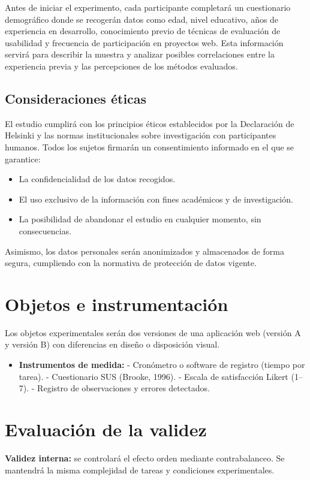 \documentclass[a4paper,12pt]{report}
\begin{document}
Antes de iniciar el experimento, cada participante completará un cuestionario demográfico donde se recogerán datos como edad, nivel educativo, años de experiencia en desarrollo, conocimiento previo de técnicas de evaluación de usabilidad y frecuencia de participación en proyectos web. Esta información servirá para describir la muestra y analizar posibles correlaciones entre la experiencia previa y las percepciones de los métodos evaluados.

\subsection*{Consideraciones éticas}
El estudio cumplirá con los principios éticos establecidos por la Declaración de Helsinki y las normas institucionales sobre investigación con participantes humanos. Todos los sujetos firmarán un consentimiento informado en el que se garantice:
\begin{itemize}
    \item La confidencialidad de los datos recogidos.
    \item El uso exclusivo de la información con fines académicos y de investigación.
    \item La posibilidad de abandonar el estudio en cualquier momento, sin consecuencias.
\end{itemize}
Asimismo, los datos personales serán anonimizados y almacenados de forma segura, cumpliendo con la normativa de protección de datos vigente.

\section{Objetos e instrumentación}
Los objetos experimentales serán dos versiones de una aplicación web (versión A y versión B) con diferencias en diseño o disposición visual.  
\begin{itemize}
    \item \textbf{Instrumentos de medida:}  
    - Cronómetro o software de registro (tiempo por tarea).  
    - Cuestionario SUS (Brooke, 1996).  
    - Escala de satisfacción Likert (1--7).  
    - Registro de observaciones y errores detectados.  
\end{itemize}

\section{Evaluación de la validez}

\textbf{Validez interna:} se controlará el efecto orden mediante contrabalanceo. Se mantendrá la misma complejidad de tareas y condiciones experimentales.  
\end{document}

